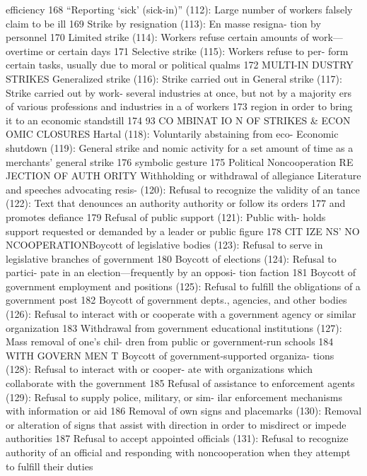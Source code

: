 \documentclass[twoside,a4paper,12pt,fleqn,openany]{extbook}
\begin{document}
efficiency
 168
“Reporting ‘sick’ (sick-in)” (112): Large number
of workers falsely claim to be ill
 169
Strike by resignation (113): En masse resigna-
tion by personnel
 170
Limited strike (114): Workers refuse certain
amounts of work—overtime or certain days 171
Selective strike (115): Workers refuse to per-
form certain tasks, usually due to moral or
political qualms
 172
MULTI-IN DUSTRY STRIKES
Generalized strike (116): Strike carried out in
 General strike (117): Strike carried out by work-
several industries at once, but not by a majority
 ers of various professions and industries in a
of workers
 173
 region in order to bring it to an economic
standstill
 174
93
CO MBINAT IO N OF STRIKES & ECON OMIC CLOSURES
Hartal (118): Voluntarily abstaining from eco-
 Economic shutdown (119): General strike and
nomic activity for a set amount of time as a
 merchants’ general strike
 176
symbolic gesture
 175
Political Noncooperation
RE JECTION OF AUTH ORITY
Withholding or withdrawal of allegiance
 Literature and speeches advocating resis-
(120): Refusal to recognize the validity of an
 tance (122): Text that denounces an authority
authority or follow its orders
 177
 and promotes defiance
 179
Refusal of public support (121): Public with-
holds support requested or demanded by a
leader or public figure
 178
CIT IZE NS’ NO NCOOPERATIONBoycott of legislative bodies (123): Refusal to
serve in legislative branches of government		
180
Boycott of elections (124): Refusal to partici-
pate in an election—frequently by an opposi-
tion faction
 181
Boycott of government employment and
positions (125): Refusal to fulfill the obligations
of a government post
 182
Boycott of government depts., agencies, and
other bodies (126): Refusal to interact with or
cooperate with a government agency or similar
organization
 183
Withdrawal from government educational
institutions (127): Mass removal of one’s chil-
dren from public or government-run schools		
184
WITH GOVERN MEN T
Boycott of government-supported organiza-
tions (128): Refusal to interact with or cooper-
ate with organizations which collaborate with
the government
 185
Refusal of assistance to enforcement agents
(129): Refusal to supply police, military, or sim-
ilar enforcement mechanisms with information
or aid
 186
Removal of own signs and placemarks (130):
Removal or alteration of signs that assist with
direction in order to misdirect or impede
authorities
 187
Refusal to accept appointed officials (131):
Refusal to recognize authority of an official and
responding with noncooperation when they
attempt to fulfill their duties
\end{document}
